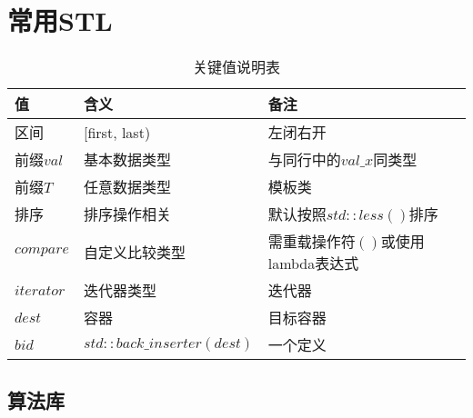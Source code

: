 \section{常用STL}

\begin{table}[htbp]
  \centering
  \caption{关键值说明表}
  \begin{tabularx}{\textwidth}{>{\raggedright\arraybackslash}X >{\centering\arraybackslash}X >{\raggedleft\arraybackslash}X}
    \toprule
    \rowcolor{headerbg}
    \textbf{值} & \textbf{含义} & \textbf{备注} \\
    \midrule
    区间 & [first, last) & 左闭右开 \\
    前缀$val$ & 基本数据类型 & 与同行中的$val\_x$同类型 \\
    前缀$T$ & 任意数据类型 & 模板类 \\
    排序 & 排序操作相关 & 默认按照$std::less()$排序 \\
    $compare$ & 自定义比较类型 & 需重载操作符$()$或使用lambda表达式 \\
    $iterator$ & 迭代器类型 & 迭代器 \\
    $dest$ & 容器 & 目标容器 \\
    $bid$ & $std::back\_inserter(dest)$ & 一个定义 \\
    \bottomrule
  \end{tabularx}
\end{table}

\subsection{算法库}

























